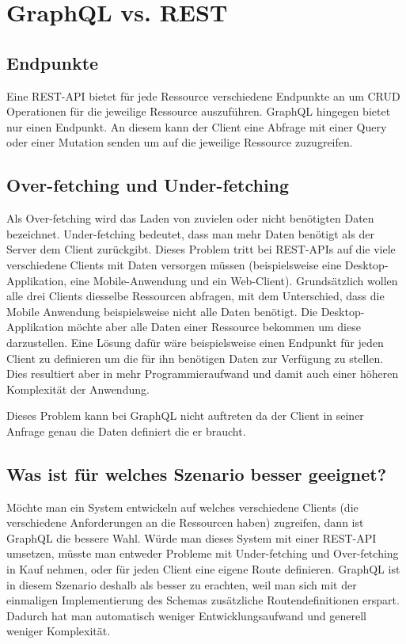 \documentclass[bachelor, german ]{hgbthesis}
\begin{document}
\section{GraphQL vs. REST}
\subsection{Endpunkte}
Eine REST-API bietet für jede Ressource verschiedene Endpunkte an um CRUD Operationen für die jeweilige Ressource auszuführen. GraphQL hingegen bietet nur einen
Endpunkt. An diesem kann der Client eine Abfrage mit einer Query oder einer Mutation senden um auf die jeweilige Ressource zuzugreifen.

\subsection{Over-fetching und Under-fetching}
Als Over-fetching wird das Laden von zuvielen oder nicht benötigten Daten bezeichnet.
Under-fetching bedeutet, dass man mehr Daten benötigt als der Server dem Client zurückgibt. Dieses Problem tritt bei REST-APIs auf die viele verschiedene Clients mit Daten versorgen müssen (beispielsweise eine Desktop-Applikation, eine Mobile-Anwendung
und ein Web-Client). Grundsätzlich wollen alle drei Clients diesselbe Ressourcen abfragen, mit dem Unterschied, dass die Mobile Anwendung beispielsweise nicht alle Daten
benötigt. Die Desktop-Applikation möchte aber alle Daten einer Ressource bekommen
um diese darzustellen. Eine Lösung dafür wäre beispielsweise einen Endpunkt für jeden
Client zu definieren um die für ihn benötigen Daten zur Verfügung zu stellen. Dies resultiert aber in mehr Programmieraufwand und damit auch einer höheren Komplexität
der Anwendung.
\newline

Dieses Problem kann bei GraphQL nicht auftreten da der Client in seiner Anfrage genau die Daten definiert die er braucht.

\subsection{Was ist für welches Szenario besser geeignet?}
Möchte man ein System entwickeln auf welches verschiedene Clients (die verschiedene Anforderungen an die Ressourcen haben) zugreifen, dann ist GraphQL die bessere
Wahl. Würde man dieses System mit einer REST-API umsetzen, müsste man entweder
Probleme mit Under-fetching und Over-fetching in Kauf nehmen, oder für jeden Client eine eigene Route definieren. GraphQL ist in diesem Szenario deshalb als besser zu
erachten, weil man sich mit der einmaligen Implementierung des Schemas zusätzliche
Routendefinitionen erspart. Dadurch hat man automatisch weniger Entwicklungsaufwand und generell weniger Komplexität.
\newline
\end{document}
